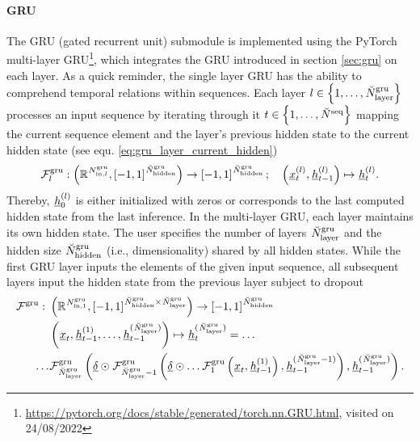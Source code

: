 \paragraph*{GRU} ${}$\\
The GRU (gated recurrent unit) submodule
is implemented using the PyTorch
multi-layer GRU\footnote{
    \url{https://pytorch.org/docs/stable/generated/torch.nn.GRU.html}, visited on 24/08/2022
},
which integrates the GRU \cite{Cho2014} 
introduced in section \ref{sec:gru} on each layer.
As a quick reminder, 
the single layer GRU 
has the ability to comprehend temporal relations within sequences.
Each layer 
$l \in \setOfInts{1, \dots, \GRUNumLayer}$ 
processes an input sequence by
iterating through it
$t \in \setOfInts{1, \dots, \seqLen}$ 
mapping the current sequence element
and the layer's previous hidden state
to the current hidden state (see equ. \ref{eq:gru_layer_current_hidden})
\begin{align}
    \GRULayerMap{l}
    :
    \tuple{
        \setOfAllRealNumbers^{\GRUInp{l}}, 
        \setOfRealNumbers{-1, 1}^{\GRUHiddenSize}
    }
    \rightarrow 
    \setOfRealNumbers{-1, 1}^{\GRUHiddenSize}
    ;\quad
    \tuple{\featvec[]{(l)}{t}{}{}, \hiddenstate[]{(l)}{t-1}{}{}}
    \mapsto
    \hiddenstate[]{(l)}{t}{}{}.
\end{align}
Thereby, $\hiddenstate[]{(l)}{0}{}{}$ is either initialized with zeros 
or corresponds to the last computed hidden state from the last inference.
 In the multi-layer GRU,
each layer maintains its own hidden state.
The user specifies the number of layers 
$\GRUNumLayer$
and the hidden size 
$\GRUHiddenSize$ (i.e., dimensionality) shared by all hidden states.
While the first GRU layer inputs the elements of the given input sequence,
all subsequent layers input the hidden state from the previous layer subject to dropout
\begin{align} \label{eq:gru}
    \GRUMap
    :\ &
    \tuple{
        \setOfAllRealNumbers^{\GRUInp{1}},
        \setOfRealNumbers{-1, 1}^{\GRUHiddenSize \times \GRUNumLayer}
    }
    \rightarrow 
    \setOfRealNumbers{-1, 1}^{\GRUHiddenSize}
    \nonumber \\
    &\tuple{
        \featvec[]{}{t}{}{}, 
        \hiddenstate[]{(1)}{t-1}{}{},
        \dots,
        \hiddenstate[]{(\GRUNumLayer)}{t-1}{}{}
    }
    \mapsto 
    \hiddenstate[]{(\GRUNumLayer)}{t}{}{} =
    \dots
    \nonumber \\
    \dots &\GRULayerMap{\GRUNumLayer} \tuple{
        \GRUDropout \odot
        \GRULayerMap{\GRUNumLayer - 1} \tuple{
            \GRUDropout \odot
                \dots \GRULayerMap{1} \tuple{
                    \featvec[]{}{t}{}{}
                    ,
                    \hiddenstate[]{(1)}{t-1}{}{}
                }
            ,
            \hiddenstate[]{(\GRUNumLayer-1)}{t-1}{}{}
        },
        \hiddenstate[]{(\GRUNumLayer)}{t-1}{}{}
    }
    .
\end{align}
